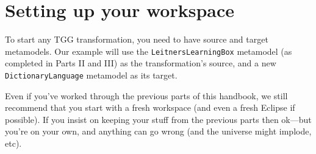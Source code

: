 \newpage
\section{Setting up your workspace}
\genHeader

To start any TGG transformation, you need to have source and target metamodels. 
Our example will use the \texttt{LeitnersLearningBox} metamodel (as completed in Parts II and III) as the transformation's source, and a new \texttt{DictionaryLanguage} metamodel as its target.

Even if you've worked through the previous parts of this handbook, we still recommend that you start with a fresh workspace (and even a fresh Eclipse if possible). 
If you insist on keeping your stuff from the previous parts then ok---but you're on your own, and anything can go wrong (and the universe might implode, etc).




